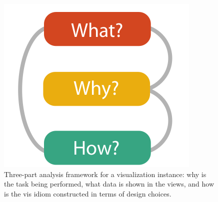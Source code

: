 \begin{figure}[ht]
\centering
\includegraphics[keepaspectratio]{images/basics/analysis-framework.png}
\caption[
    Three-part analysis framework for a visualization instance: why is the task being performed, what data is shown in the views, and how is the vis idiom constructed in terms of design choices .
]{Three-part analysis framework for a visualization instance: why is the task being performed, what data is shown in the views, and how is the vis idiom constructed in terms of design choices.}
\label{fig:an-framework}
\end{figure}